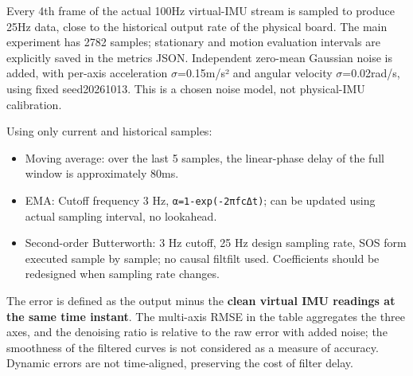 Every 4th frame of the actual 100Hz virtual-IMU stream is sampled to produce 25Hz data, close to the historical output rate of the physical board. The main experiment has 2782 samples; stationary and motion evaluation intervals are explicitly saved in the metrics JSON. Independent zero-mean Gaussian noise is added, with per-axis acceleration \(\sigma\)=0.15m/s² and angular velocity \(\sigma\)=0.02rad/s, using fixed seed20261013. This is a chosen noise model, not physical-IMU calibration.

Using only current and historical samples:

\begin{itemize}
\tightlist
\item
  Moving average: over the last 5 samples, the linear-phase delay of the full window is approximately 80ms.
\item
  EMA: Cutoff frequency 3 Hz, \texttt{α=1-exp(-2πfcΔt)}; can be updated using actual sampling interval, no lookahead.
\item
  Second-order Butterworth: 3 Hz cutoff, 25 Hz design sampling rate, SOS form executed sample by sample; no causal filtfilt used. Coefficients should be redesigned when sampling rate changes.
\end{itemize}

The error is defined as the output minus the \textbf{clean virtual IMU readings at the same time instant}. The multi-axis RMSE in the table aggregates the three axes, and the denoising ratio is relative to the raw error with added noise; the smoothness of the filtered curves is not considered as a measure of accuracy. Dynamic errors are not time-aligned, preserving the cost of filter delay.

